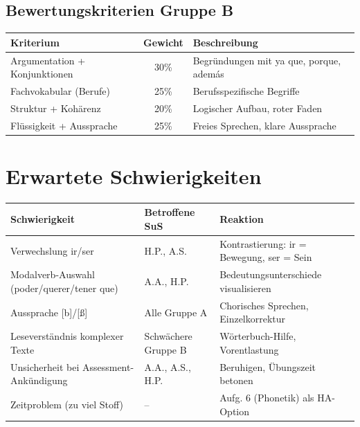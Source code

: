 \documentclass[11pt,a4paper]{article}
\begin{document}
\subsection{Bewertungskriterien Gruppe B}

\begin{tabular}{|l|c|p{6cm}|}
\hline
\textbf{Kriterium} & \textbf{Gewicht} & \textbf{Beschreibung} \\
\hline
Argumentation + Konjunktionen & 30\% & Begründungen mit ya que, porque, además \\
\hline
Fachvokabular (Berufe) & 25\% & Berufsspezifische Begriffe \\
\hline
Struktur + Kohärenz & 20\% & Logischer Aufbau, roter Faden \\
\hline
Flüssigkeit + Aussprache & 25\% & Freies Sprechen, klare Aussprache \\
\hline
\end{tabular}

\section{Erwartete Schwierigkeiten}

\begin{tabular}{|p{4cm}|p{4cm}|p{5cm}|}
\hline
\textbf{Schwierigkeit} & \textbf{Betroffene SuS} & \textbf{Reaktion} \\
\hline
Verwechslung ir/ser & H.P., A.S. & Kontrastierung: ir = Bewegung, ser = Sein \\
\hline
Modalverb-Auswahl (poder/querer/tener que) & A.A., H.P. & Bedeutungsunterschiede visualisieren \\
\hline
Aussprache [b]/[\ss] & Alle Gruppe A & Chorisches Sprechen, Einzelkorrektur \\
\hline
Leseverständnis komplexer Texte & Schwächere Gruppe B & Wörterbuch-Hilfe, Vorentlastung \\
\hline
Unsicherheit bei Assessment-Ankündigung & A.A., A.S., H.P. & Beruhigen, Übungszeit betonen \\
\hline
Zeitproblem (zu viel Stoff) & -- & Aufg. 6 (Phonetik) als HA-Option \\
\hline
\end{tabular}

\end{document}
